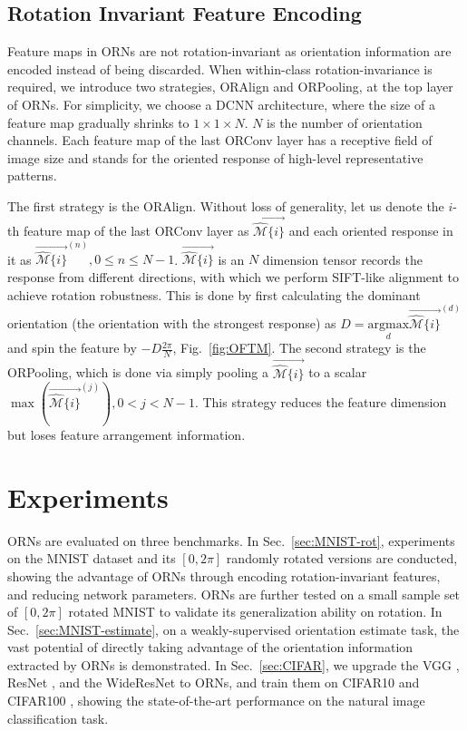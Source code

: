 \documentclass[10pt,twocolumn,letterpaper]{article}
\begin{document}
\subsection{Rotation Invariant Feature Encoding}
\label{sec:rot-inv-encoding}
    Feature maps in ORNs are not rotation-invariant as orientation information are encoded instead of being discarded.
    When within-class rotation-invariance is required, we introduce two strategies, ORAlign and ORPooling, at the top layer of ORNs.
    For simplicity, we choose a DCNN architecture, where the size of a feature map gradually shrinks to $1 \times 1 \times N$. $N$ is the number of orientation channels. Each {feature map} of the last ORConv layer has a receptive field of image size and stands for the oriented response of high-level representative patterns.

    The first strategy is the ORAlign. Without loss of generality, let us denote the $i$-th {feature map} of the last ORConv layer as $\overrightarrow{\hat{\mathcal{M}}\{i\}}$ and each oriented response in it as $\overrightarrow{\hat{\mathcal{M}}\{i\}}^{(n)}, 0 \leq n \leq N-1$.  $\overrightarrow{\hat{\mathcal{M}}\{i\}}$ is an $N$ dimension tensor records the response from different directions, with which we perform SIFT-like alignment to achieve rotation robustness. This is done by first calculating the dominant orientation (the orientation with the strongest response) as $D = {\underset{d}{\mathrm{argmax}}}\overrightarrow{\hat{\mathcal{M}}\{i\}}^{(d)}$ and spin the feature by $-D\frac{2\pi}{N}$, Fig.~\ref{fig:OFTM}.
    The second strategy is the ORPooling, which is done via simply pooling a $\overrightarrow{\hat{\mathcal{M}}\{i\}}$ to a scalar $\max(\overrightarrow{\hat{\mathcal{M}}\{i\}}^{(j)}),0<j<N-1$.
    This strategy reduces the feature dimension but loses feature arrangement information.

\section{Experiments}
    ORNs are evaluated on three benchmarks. In Sec.~\ref{sec:MNIST-rot}, experiments on the MNIST dataset \cite{Liu2003} and its $[0,2\pi]$ randomly rotated versions are conducted, showing the advantage of ORNs through encoding rotation-invariant features, and reducing network parameters. ORNs are further tested on a small sample set of $[0,2\pi]$ rotated MNIST \cite{Larochelle2007} to validate its generalization ability on rotation.
    In Sec.~\ref{sec:MNIST-estimate}, on a weakly-supervised orientation estimate task, the vast potential of directly taking advantage of the orientation information extracted by ORNs is demonstrated.
    In Sec.~\ref{sec:CIFAR}, we upgrade the VGG \cite{Simonyan2014}, ResNet \cite{He2015}, and the WideResNet \cite{Zagoruyko2016} to ORNs, and {train} them on CIFAR10 and CIFAR100 \cite{Krizhevsky2009}, showing the state-of-the-art performance on the natural image classification task.
\end{document}
